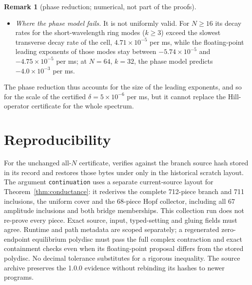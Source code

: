 \documentclass[11pt]{article}
\theoremstyle{definition}
\newtheorem{remark}[lemma]{Remark}
\begin{document}
\begin{remark}[phase reduction; numerical, not part of the proofs]
\begin{itemize}
\item \emph{Where the phase model fails.} It is not uniformly valid. For $N \ge 16$ its decay rates for the short-wavelength ring modes ($k \ge 3$) exceed the slowest transverse decay rate of the cell, $4.71 \times 10^{-5}$ per ms, while the floating-point leading exponents of those modes stay between $-5.74 \times 10^{-5}$ and $-4.75 \times 10^{-5}$ per ms; at $N = 64$, $k = 32$, the phase model predicts $-4.0 \times 10^{-3}$ per ms.
\end{itemize}
The phase reduction thus accounts for the size of the leading exponents, and so for the scale of the certified $\delta = 5 \times 10^{-6}$ per ms, but it cannot replace the Hill-operator certificate for the whole spectrum.
\end{remark}

\section{Reproducibility}\label{sec:reproduce}

For the unchanged all-$N$ certificate,  verifies  against the branch source hash stored in its record and restores those bytes under  only in the historical scratch layout. The argument \texttt{continuation} uses a separate current-source layout for Theorem~\ref{thm:conductance}: it rederives the complete 712-piece branch and 711 inclusions, the uniform cover and the 68-piece Hopf collector, including all 67 amplitude inclusions and both bridge memberships. This collection run does not re-prove every piece. Exact source, input, typed-setting and gluing fields must agree. Runtime and path metadata are scoped separately; a regenerated zero-endpoint equilibrium polydisc must pass the full complex contraction and exact containment checks even when its floating-point proposal differs from the stored polydisc. No decimal tolerance substitutes for a rigorous inequality. The source archive preserves the 1.0.0 evidence without rebinding its hashes to newer programs.
\end{document}

